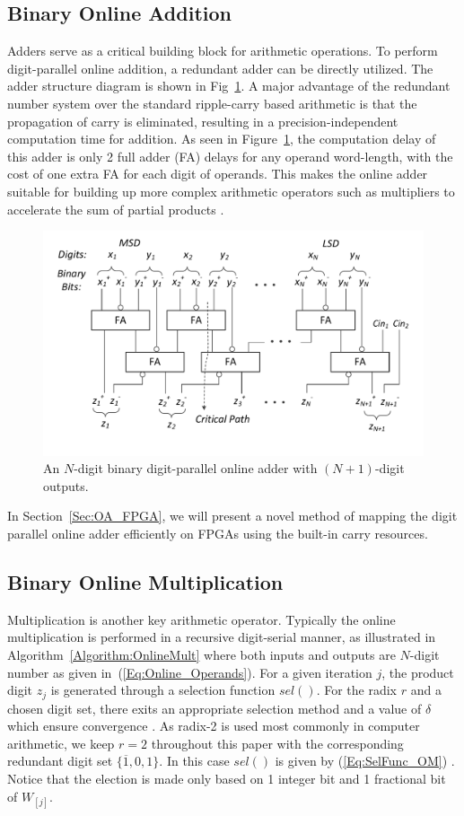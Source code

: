 \documentclass[conference]{IEEEtran}
\begin{document}
\subsection{Binary Online Addition}
Adders serve as a critical building block for arithmetic operations. To perform digit-parallel online addition, a redundant adder can be directly utilized. The adder structure diagram is shown in Fig~\ref{Fig:Radix2SD_adder}. A major advantage of the redundant number system over the standard ripple-carry based arithmetic is that the propagation of carry is eliminated, resulting in a precision-independent computation time for addition. As seen in Figure~\ref{Fig:Radix2SD_adder}, the computation delay of this adder is only 2 full adder (FA) delays for any operand word-length, with the cost of one extra FA for each digit of operands. This makes the online adder suitable for building up more complex arithmetic operators such as multipliers to accelerate the sum of partial products \cite{RedundantMult_1987}.

\begin{figure}[htbp]
	\centering
	\includegraphics[width=.5\textwidth]{./Figures/SDAdder.pdf}
	\caption{An $N$-digit binary digit-parallel online adder with $(N+1)$-digit outputs.}
	\label{Fig:Radix2SD_adder}
\end{figure}

In Section~\ref{Sec:OA_FPGA}, we will present a novel method of mapping the digit parallel online adder efficiently on FPGAs using the built-in carry resources.

\subsection{Binary Online Multiplication}
Multiplication is another key arithmetic operator. Typically the online multiplication is performed in a recursive digit-serial manner, as illustrated in Algorithm~\ref{Algorithm:OnlineMult} \cite{Ercegovac_OnlineMult} where both inputs and outputs are $N$-digit number as given in~(\ref{Eq:Online_Operands}). For a given iteration $j$, the product digit $z_j$ is generated through a selection function $sel()$. For the radix $r$ and a chosen digit set, there exits an appropriate selection method and a value of $\delta$ which ensure convergence \cite{Ercegovac_OnlineMult}. As radix-2 is used most commonly in computer arithmetic, we keep $r=2$ throughout this paper with the corresponding redundant digit set $\{\overline{1},0,1\}$. In this case $sel()$ is given by (\ref{Eq:SelFunc_OM}) \cite{Oregon_OnlineNetwork}. Notice that the election is made only based on 1 integer bit and 1 fractional bit of $W_{[j]}$.
\end{document}
